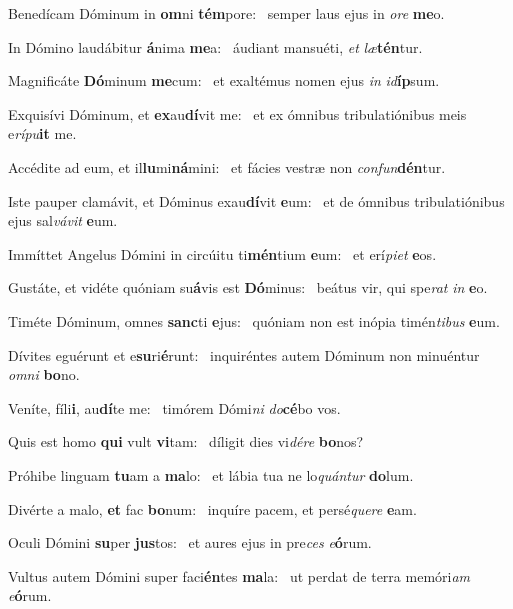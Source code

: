\item Benedícam Dóminum in \textbf{om}ni \textbf{tém}pore:~\psstar{} semper laus ejus in \textit{ore} \textbf{me}o.
\item In Dómino laudábitur \textbf{á}nima \textbf{me}a:~\psstar{} áudiant mansuéti, \textit{et} \textit{læ}\textbf{tén}tur.
\item Magnificáte \textbf{Dó}minum \textbf{me}cum:~\psstar{} et exaltémus nomen ejus \textit{in} \textit{id}\textbf{íp}sum.
\item Exquisívi Dóminum, et \textbf{ex}au\textbf{dí}vit me:~\psstar{} et ex ómnibus tribulatiónibus meis e\textit{rípu}\textbf{it} me.
\item Accédite ad eum, et il\textbf{lu}mi\textbf{ná}mini:~\psstar{} et fácies vestræ non \textit{confun}\textbf{dén}tur.
\item Iste pauper clamávit, et Dóminus exau\textbf{dí}vit \textbf{e}um:~\psstar{} et de ómnibus tribulatiónibus ejus sal\textit{vávit} \textbf{e}um.
\item Immíttet Angelus Dómini in circúitu ti\textbf{mén}tium \textbf{e}um:~\psstar{} et erí\textit{piet} \textbf{e}os.
\item Gustáte, et vidéte quóniam su\textbf{á}vis est \textbf{Dó}minus:~\psstar{} beátus vir, qui spe\textit{rat} \textit{in} \textbf{e}o.
\item Timéte Dóminum, omnes \textbf{sanc}ti \textbf{e}jus:~\psstar{} quóniam non est inópia timén\textit{tibus} \textbf{e}um.
\item Dívites eguérunt et e\textbf{su}ri\textbf{é}\-runt:~\psstar{} inquiréntes autem Dóminum non minuéntur \textit{omni} \textbf{bo}no.
\item Veníte, fíli\textbf{i}, au\textbf{dí}te me:~\psstar{} timórem Dómi\textit{ni} \textit{do}\textbf{cé}bo vos.
\item Quis est homo \textbf{qui} vult \textbf{vi}tam:~\psstar{} díligit dies vi\textit{dére} \textbf{bo}nos?
\item Próhibe linguam \textbf{tu}am a \textbf{ma}lo:~\psstar{} et lábia tua ne lo\textit{quántur} \textbf{do}lum.
\item Divérte a malo, \textbf{et} fac \textbf{bo}num:~\psstar{} inquíre pacem, et persé\textit{quere} \textbf{e}am.
\item Oculi Dómini \textbf{su}per \textbf{jus}tos:~\psstar{} et aures ejus in pre\textit{ces} \textit{e}\textbf{ó}rum.
\item Vultus autem Dómini super faci\textbf{én}tes \textbf{ma}la:~\psstar{} ut perdat de terra memóri\textit{am} \textit{e}\textbf{ó}rum.
